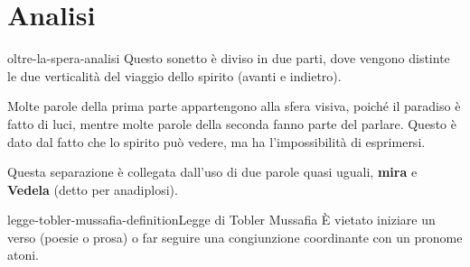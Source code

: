 \documentclass[preview]{standalone}
\begin{document}
\section{Analisi}

\begin{snippet}{oltre-la-spera-analisi}
    Questo sonetto è diviso in due parti, dove vengono distinte le due verticalità del viaggio dello spirito
    (avanti e indietro).
    
    Molte parole della prima parte appartengono alla sfera visiva, poiché il paradiso
    è fatto di luci, mentre molte parole della seconda fanno parte del parlare.
    Questo è dato dal fatto che lo spirito può vedere, ma ha l'impossibilità di esprimersi.
    
    Questa separazione è collegata dall'uso di due parole quasi uguali,
    \textbf{mira} e \textbf{Vedela} (detto per anadiplosi).
\end{snippet}


\begin{snippetdefinition}{legge-tobler-mussafia-definition}{Legge di Tobler Mussafia}
    È vietato iniziare un verso (poesie o prosa) o far seguire una congiunzione coordinante
    con un pronome atoni.
\end{snippetdefinition}
\end{document}
